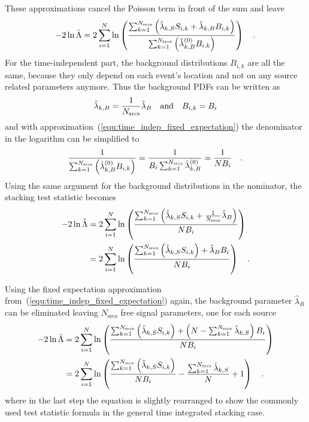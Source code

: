 These approximations cancel the Poisson term in front of the sum and leave
\begin{equation}
  -2\ln\hat{\Lambda}
  = 2\sum_{i=1}^N \ln\left(
    \frac{\sum_{k=1}^{N_\text{srcs}}\left(
          \hat{\lambda}_{k,S} S_{i,k}+\hat{\lambda}_{k,B} B_{i,k}\right)}
          {\sum_{k=1}^{N_\text{srcs}}\left(
            \hat{\lambda}_{k,B}^{(0)} B_{i,k} \right)}
        \right)
  \quad\text{.}
\end{equation}
For the time-independent part, the background distributions $B_{i,k}$ are all the same, because they only depend on each event's location and not on any source related parameters anymore.
Thus the background PDFs can be written as
\begin{equation}
  \hat{\lambda}_{k,B} = \frac{1}{N_\text{srcs}} \hat{\lambda}_B
  \quad\text{and}\quad B_{i,k} = B_i
\end{equation}
and with approximation~(\ref{equ:time_indep_fixed_expectation}) the denominator in the logarithm can be simplified to
\begin{equation}
  \frac{1}{\sum_{k=1}^{N_\text{srcs}}\left(
           \hat{\lambda}_{k,B}^{(0)}B_{i,k} \right)}
  = \frac{1}{B_i \sum_{k=1}^{N_\text{srcs}}\hat{\lambda}_{k,B}^{(0)}}
  = \frac{1}{N B_i}
  \quad\text{.}
\end{equation}
Using the same argument for the background distributions in the nominator, the stacking test statistic becomes
\begin{align}
  -2\ln\hat{\Lambda}
  &= 2\sum_{i=1}^N \ln\left(
      \frac{\sum_{k=1}^{N_\text{srcs}}
            \left(
              \hat{\lambda}_{k,S} S_{i,k} +
              \frac{1}{N_\text{srcs}} \hat{\lambda}_B
            \right)}{N B_i}
     \right) \\
  &= 2\sum_{i=1}^N \ln\left(
    \frac{\sum_{k=1}^{N_\text{srcs}}\left(\hat{\lambda}_{k,S} S_{i,k}\right) +
          \hat{\lambda}_B B_i}{N B_i} \right)
  \quad\text{.}
\end{align}

Using the fixed expectation approximation from~(\ref{equ:time_indep_fixed_expectation}) again, the background parameter $\hat{\lambda}_B$ can be eliminated leaving $N_\text{srcs}$ free signal parameters, one for each source
\begin{align}
  -2\ln\hat{\Lambda}
  &= 2\sum_{i=1}^N \ln\left(
    \frac{\sum_{k=1}^{N_\text{srcs}}\left(\hat{\lambda}_{k,S} S_{i,k}\right) +
          \left(
            N - \sum_{k=1}^{N_\text{srcs}}\hat{\lambda}_{k,S}
          \right) B_i}{N B_i} \right) \\
  &= 2\sum_{i=1}^N \ln\left(
      \frac{\sum_{k=1}^{N_\text{srcs}}\left(\hat{\lambda}_{k,S}
              S_{i,k}\right)}{N B_i} -
      \frac{\sum_{k=1}^{N_\text{srcs}}\hat{\lambda}_{k,S}}{N} + 1
    \right)
  \quad\text{.}
\end{align}
where in the last step the equation is slightly rearranged to show the commonly used test statistic formula in the general time integrated stacking case.

